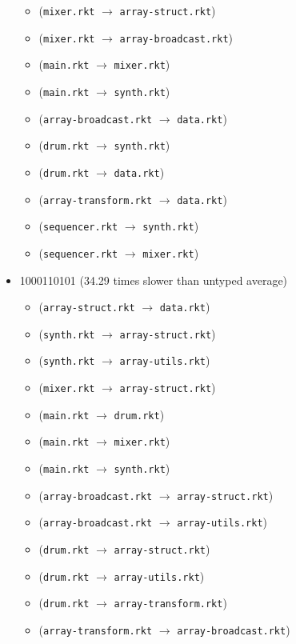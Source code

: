 \documentclass{article}
\newcommand{\mono}[1]{\texttt{#1}}
\begin{document}
\begin{itemize}
\begin{itemize}
  \item (\mono{mixer.rkt} $\rightarrow$ \mono{array-struct.rkt})
  \item (\mono{mixer.rkt} $\rightarrow$ \mono{array-broadcast.rkt})
  \item (\mono{main.rkt} $\rightarrow$ \mono{mixer.rkt})
  \item (\mono{main.rkt} $\rightarrow$ \mono{synth.rkt})
  \item (\mono{array-broadcast.rkt} $\rightarrow$ \mono{data.rkt})
  \item (\mono{drum.rkt} $\rightarrow$ \mono{synth.rkt})
  \item (\mono{drum.rkt} $\rightarrow$ \mono{data.rkt})
  \item (\mono{array-transform.rkt} $\rightarrow$ \mono{data.rkt})
  \item (\mono{sequencer.rkt} $\rightarrow$ \mono{synth.rkt})
  \item (\mono{sequencer.rkt} $\rightarrow$ \mono{mixer.rkt})
  \end{itemize}
\item 1000110101 (34.29 times slower than untyped average)
  \begin{itemize}
  \item (\mono{array-struct.rkt} $\rightarrow$ \mono{data.rkt})
  \item (\mono{synth.rkt} $\rightarrow$ \mono{array-struct.rkt})
  \item (\mono{synth.rkt} $\rightarrow$ \mono{array-utils.rkt})
  \item (\mono{mixer.rkt} $\rightarrow$ \mono{array-struct.rkt})
  \item (\mono{main.rkt} $\rightarrow$ \mono{drum.rkt})
  \item (\mono{main.rkt} $\rightarrow$ \mono{mixer.rkt})
  \item (\mono{main.rkt} $\rightarrow$ \mono{synth.rkt})
  \item (\mono{array-broadcast.rkt} $\rightarrow$ \mono{array-struct.rkt})
  \item (\mono{array-broadcast.rkt} $\rightarrow$ \mono{array-utils.rkt})
  \item (\mono{drum.rkt} $\rightarrow$ \mono{array-struct.rkt})
  \item (\mono{drum.rkt} $\rightarrow$ \mono{array-utils.rkt})
  \item (\mono{drum.rkt} $\rightarrow$ \mono{array-transform.rkt})
  \item (\mono{array-transform.rkt} $\rightarrow$ \mono{array-broadcast.rkt})

\end{itemize}
\end{itemize}
\end{document}
